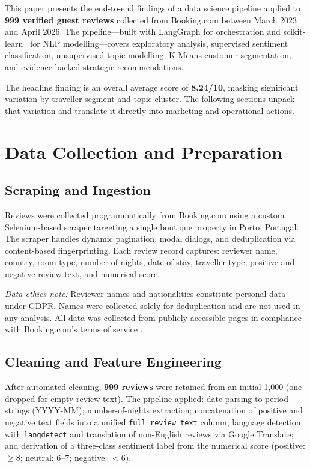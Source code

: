 \documentclass[runningheads]{llncs}
\begin{document}
This paper presents the end-to-end findings of a data science pipeline
applied to \textbf{999 verified guest reviews} collected from
Booking.com between March 2023 and April 2026. The pipeline---built
with LangGraph for orchestration and scikit-learn~\cite{scikit-learn}
for NLP modelling---covers exploratory analysis, supervised sentiment
classification, unsupervised topic modelling, K-Means customer
segmentation, and evidence-backed strategic recommendations.

The headline finding is an overall average score of \textbf{8.24/10},
masking significant variation by traveller segment and topic cluster.
The following sections unpack that variation and translate it directly
into marketing and operational actions.

\section{Data Collection and Preparation}

\subsection{Scraping and Ingestion}

Reviews were collected programmatically from Booking.com using a
custom Selenium-based scraper targeting a single boutique property in
Porto, Portugal. The scraper handles dynamic pagination, modal dialogs,
and deduplication via content-based fingerprinting. Each review record
captures: reviewer name, country, room type, number of nights, date of
stay, traveller type, positive and negative review text, and numerical
score.

\textit{Data ethics note:} Reviewer names and nationalities constitute
personal data under GDPR. Names were collected solely for deduplication
and are not used in any analysis. All data was collected from publicly
accessible pages in compliance with Booking.com's terms of service
\cite{booking2026}.

\subsection{Cleaning and Feature Engineering}

After automated cleaning, \textbf{999 reviews} were retained from an
initial 1,000 (one dropped for empty review text). The pipeline applied:
date parsing to period strings (YYYY-MM); number-of-nights extraction;
concatenation of positive and negative text fields into a unified
\texttt{full\_review\_text} column; language detection with
\texttt{langdetect} and translation of non-English reviews via Google
Translate; and derivation of a three-class sentiment label from the
numerical score (positive: $\geq 8$; neutral: 6--7; negative:
$< 6$).
\end{document}
